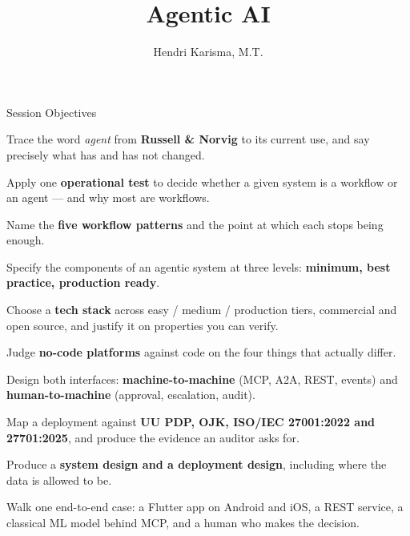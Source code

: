 \documentclass[aspectratio=169,11pt,t]{beamer}
\title{Agentic AI}
\author{Hendri Karisma, M.T.}
\date{}
\begin{document}
\covertitle

\begin{frame}[shrink=25]{Session Objectives}
\begin{isteps}
\item Trace the word \textit{agent} from \textbf{Russell \& Norvig} to its current use, and say precisely what has and has not changed.
\item Apply one \textbf{operational test} to decide whether a given system is a workflow or an agent --- and why most are workflows.
\item Name the \textbf{five workflow patterns} and the point at which each stops being enough.
\item Specify the components of an agentic system at three levels: \textbf{minimum, best practice, production ready}.
\item Choose a \textbf{tech stack} across easy / medium / production tiers, commercial and open source, and justify it on properties you can verify.
\item Judge \textbf{no-code platforms} against code on the four things that actually differ.
\item Design both interfaces: \textbf{machine-to-machine} (MCP, A2A, REST, events) and \textbf{human-to-machine} (approval, escalation, audit).
\item Map a deployment against \textbf{UU PDP, OJK, ISO/IEC 27001:2022 and 27701:2025}, and produce the evidence an auditor asks for.
\item Produce a \textbf{system design and a deployment design}, including where the data is allowed to be.
\item Walk one end-to-end case: a Flutter app on Android and iOS, a REST service, a classical ML model behind MCP, and a human who makes the decision.
\end{isteps}

\vskip 6pt
\vskip 4pt
\vskip 2pt
\end{frame}
\end{document}
